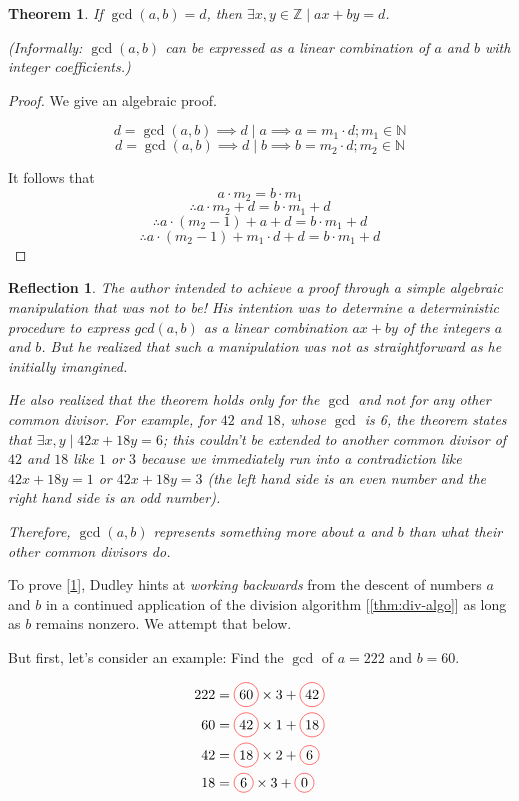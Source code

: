 \documentclass[english,notitlepage,smartquotes]{hgbreport}
\theoremstyle{definition}
\theoremstyle{remark}
\theoremstyle{plain}
\newtheorem{theorem}{Theorem}[chapter]
\renewcommand\qedsymbol{$\blacksquare$}
\newtheorem{reflection}{Reflection}
\newcommand*\circled[1]{\tikz[baseline=(char.base)]{
    \node[shape=circle,draw=red,inner sep=2pt] (char) {#1};}}
\begin{document}
\begin{theorem}
\label{thm:bezout-idty}
If $\gcd(a,b)=d$, then $\exists x,y\in\mathbb{Z}\mid ax+by=d$.

(Informally: $\gcd(a,b)$ can be expressed as a linear combination of $a$ and $b$ with integer coefficients.)
\end{theorem}
\begin{proof}\renewcommand{\qedsymbol}{\textcolor{red}{\Huge\bf ?}}
We give an algebraic proof.

$$
d=\gcd(a,b)\implies d\mid a\implies a=m_1\cdot d; m_1\in\mathbb{N}
$$
$$
d=\gcd(a,b)\implies d\mid b\implies b=m_2\cdot d; m_2\in\mathbb{N}
$$

It follows that
$$
a\cdot m_2=b\cdot m_1
$$
$$
\therefore a\cdot m_2+d=b\cdot m_1+d
$$
$$
\therefore a\cdot (m_2-1)+a+d=b\cdot m_1+d
$$
$$
\therefore a\cdot (m_2-1)+m_1\cdot d+d=b\cdot m_1+d
$$
\end{proof}
\begin{reflection}
The author intended to achieve a proof through a simple algebraic manipulation that was not to be! His intention was to determine a deterministic procedure to express $gcd(a, b)$ as a linear combination $ax+by$ of the integers $a$ and $b$. But he realized that such a manipulation was not as straightforward as he initially imangined. 

He also realized that the theorem holds only for the $\gcd$ and not for any other common divisor. For example, for $42$ and $18$, whose $\gcd$ is 6, the theorem states that $\exists x, y\mid 42x+18y=6$; this couldn't be extended to another common divisor of $42$ and $18$ like $1$ or $3$ because we immediately run into a contradiction like $42x+18y=1$ or $42x+18y=3$ (the left hand side is an even number and the right hand side is an odd number).

Therefore, $\gcd(a,b)$ represents something more about $a$ and $b$ than what their other common divisors do.
\end{reflection}

To prove [\ref{thm:bezout-idty}], Dudley hints at \emph{working backwards} from the descent of numbers $a$ and $b$ in a continued application of the division algorithm [\ref{thm:div-algo}] as long as $b$ remains nonzero. We attempt that below.

But first, let's consider an example: Find the $\gcd$ of $a=222$ and $b=60$.

\begin{align*}
222&=\circled{60}\times3+\circled{42}\\
60&=\circled{42}\times1+\circled{18}\\
42&=\circled{18}\times2+\circled{6}\\
18&=\circled{6}\times3+\circled{0}
\end{align*}
\end{document}
